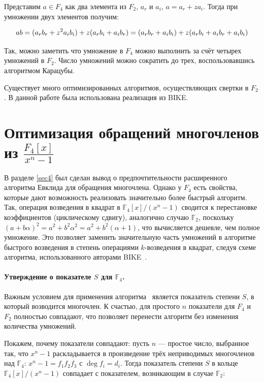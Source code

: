 \documentclass[14pt]{mmcs_article}
\theoremstyle{break}
\begin{document}
Представим $a \in F_4$ как два элемента из $F_2$, $a_r$  и $a_i$, $a = a_r + z a_i$. Тогда при умножении двух элементов получим:

\begin{equation}
    a b = (a_r b_r + z^2 a_i b_i) + z (a_r b_i + a_i b_r) \\
        = (a_r b_r + a_i b_i) + z (a_r b_i + a_i b_r + a_i b_i)
\end{equation}

Так, можно заметить что умножение в $F_4$ можно выполнить за счёт четырех умножений в $F_2$. Число умножений можно сократить до трех, воспользовавшись алгоритмом Карацубы.

Существует много оптимизированных алгоритмов, осуществляющих свертки в $F_2$. В данной работе была использована реализация из BIKE.

\section{Оптимизация обращений многочленов из $\frac{F_4[x]}{x^n - 1}$}
\label{sec6}

В разделе \ref{sec4} был сделан вывод о предпочтительности расширенного алгоритма Евклида для обращения многочлена. Однако у $F_4$ есть свойства, которые дают возможность реализовать значительно более быстрый алгоритм. Так, операция возведения в квадрат в $\mathbb{F}_4[x]/(x^n - 1)$ сводится к перестановке коэффициентов (циклическому сдвигу), аналогично случаю $\mathbb{F}_2$, поскольку $(a + b\alpha)^2 = a^2 + b^2 \alpha^2 = a^2 + b^2(\alpha + 1)$, что вычисляется дешевле, чем полное умножение. Это позволяет заменить значительную часть умножений в алгоритме быстрого возведения в степень операциями $k$-возведения в квадрат, следуя схеме алгоритма, использованного авторами BIKE~\cite{drucker-fast-polynomial-inversion}.

\paragraph{Утверждение о показателе $S$ для $\mathbb{F}_4$.}

Важным условием для применения алгоритма~\cite{drucker-fast-polynomial-inversion} является показатель степени $S$, в который возводится многочлен. К счастью, для простого $n$ показатели для $F_4$ и $F_2$ полностью совпадают, что позволяет перенести алгоритм без изменения количества умножений.

Покажем, почему показатели совпадают: пусть $n$ --- простое число, выбранное так, что $x^n - 1$ раскладывается в произведение трёх неприводимых многочленов над $\mathbb{F}_4$: $x^n - 1 = f_1 f_2 f_3$ с $\deg f_i = d_i$. Тогда показатель степени $S$ в кольце $\mathbb{F}_4[x]/(x^n - 1)$ совпадает с показателем, возникающим в случае $\mathbb{F}_2$:
\end{document}
